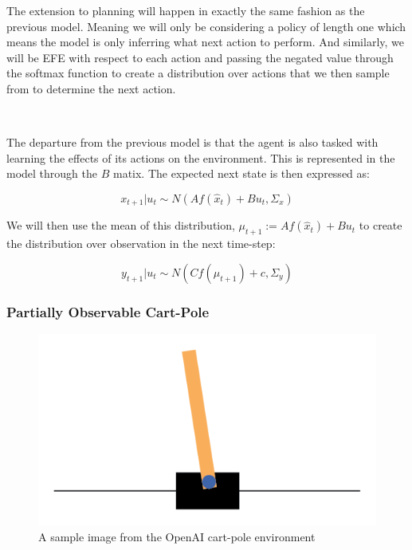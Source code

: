 \documentclass{article}
\begin{document}
The extension to planning will happen in exactly the same fashion as the previous model. Meaning we will only be considering a policy of length one which means the model is only inferring what next action to perform. And similarly, we will be EFE with respect to each action and passing the negated value through the softmax function to create a distribution over actions that we then sample from to determine the next action. 

\

The departure from the previous model is that the agent is also tasked with learning the effects of its actions on the environment. This is represented in the model through the $B$ matix. The expected next state is then expressed as:

\begin{equation}
	x_{t+1} | u_t \sim N(A f(\hat{x}_{t}) + B u_{t}, \Sigma_x)
\end{equation}

We will then use the mean of this distribution, $\mu_{t+1} := A f(\hat{x}_{t}) + B u_{t}$ to create the distribution over observation in the next time-step:

\begin{equation}
	y_{t+1} | u_t \sim N( C f(\mu_{t+1}) + c, \Sigma_y)
\end{equation}

\subsubsection{Partially Observable Cart-Pole}

\begin{figure}[htbp]
    \centering
    \includegraphics[scale=1.5]{images/cart_pole.png}
    \caption{A sample image from the OpenAI cart-pole environment}
    \label{fig:cart_pole}
\end{figure}
\end{document}
